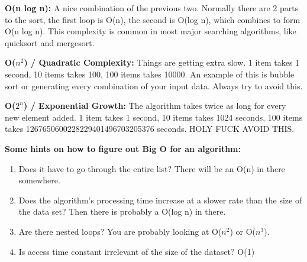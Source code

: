 \documentclass[9pt]{extarticle} %
\begin{document}
\begin{minipage}[t]{.64\linewidth}
\textbf{O(n log n):}
A nice combination of the previous two. Normally there are 2 parts to the sort,
the first loop is O(n), the second is O(log n), which combines to form O(n log n).
This complexity is common in most major searching algorithms, like quicksort and
mergesort.

\textbf{O($n^2$) / Quadratic Complexity:}
Things are getting extra slow. 1 item takes 1 second, 10 items takes 100, 
100 items takes 10000. An example of this is bubble sort or generating every 
combination of your input data. Always try to avoid this.

\textbf{O($2^n$) / Exponential Growth:}
The algorithm takes twice as long for every new element added. 1 item takes 1
second, 10 items takes 1024 seconds, 100 items takes 
1267650600228229401496703205376 seconds. HOLY FUCK AVOID THIS.

\textbf{Some hints on how to figure out Big O for an algorithm:}
\begin{enumerate}
\item Does it have to go through the entire list? There will be an O(n) in 
there somewhere.
\item Does the algorithm's processing time increase at a slower rate than 
the size of the data set? Then there is probably a O(log n) in there.
\item Are there nested loops?  You are probably looking at O($n^2$) or O($n^3$).
\item Is access time constant irrelevant of the size of the dataset? O(1)
\end{enumerate}


\end{minipage} %
\end{document}
